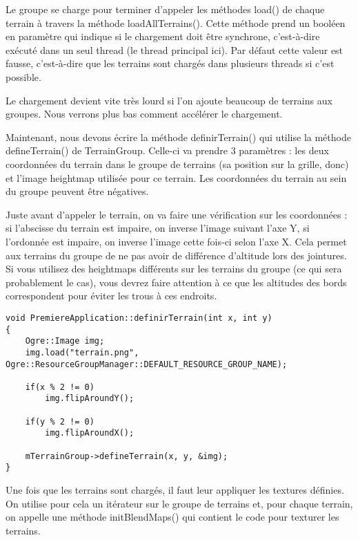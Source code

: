 \documentclass[10pt,a4paper]{report}
\begin{document}
Le groupe se charge pour terminer d'appeler les m\'ethodes load() de chaque terrain \`a travers la m\'ethode loadAllTerrains(). Cette m\'ethode prend un bool\'een en param\`etre qui indique si le chargement doit \^etre synchrone, c'est-\`a-dire ex\'ecut\'e dans un seul thread (le thread principal ici). Par d\'efaut cette valeur est fausse, c'est-\`a-dire que les terrains sont charg\'es dans plusieurs threads si c'est possible.

Le chargement devient vite tr\`es lourd si l'on ajoute beaucoup de terrains aux groupes. Nous verrons plus bas comment acc\'el\'erer le chargement.

Maintenant, nous devons \'ecrire la m\'ethode definirTerrain() qui utilise la m\'ethode defineTerrain() de TerrainGroup. Celle-ci va prendre 3 param\`etres : les deux coordonn\'ees du terrain dans le groupe de terrains (sa position sur la grille, donc) et l'image heightmap utilis\'ee pour ce terrain. Les coordonn\'ees du terrain au sein du groupe peuvent \^etre n\'egatives.

Juste avant d'appeler le terrain, on va faire une v\'erification sur les coordonn\'ees : si l'abscisse du terrain est impaire, on inverse l'image suivant l'axe Y, si l'ordonn\'ee est impaire, on inverse l'image cette fois-ci selon l'axe X. Cela permet aux terrains du groupe de ne pas avoir de diff\'erence d'altitude lors des jointures. Si vous utilisez des heightmaps diff\'erents sur les terrains du groupe (ce qui sera probablement le cas), vous devrez faire attention \`a ce que les altitudes des bords correspondent pour \'eviter les trous \`a ces endroits.

\begin{lstlisting}[caption={PremiereApplication.definirTerrain}]
void PremiereApplication::definirTerrain(int x, int y)
{
    Ogre::Image img;
    img.load("terrain.png", Ogre::ResourceGroupManager::DEFAULT_RESOURCE_GROUP_NAME);

    if(x % 2 != 0)
        img.flipAroundY();

    if(y % 2 != 0)
        img.flipAroundX();

    mTerrainGroup->defineTerrain(x, y, &img);
}
\end{lstlisting}

Une fois que les terrains sont charg\'es, il faut leur appliquer les textures d\'efinies. On utilise pour cela un it\'erateur sur le groupe de terrains et, pour chaque terrain, on appelle une m\'ethode initBlendMaps() qui contient le code pour texturer les terrains.
\end{document}
